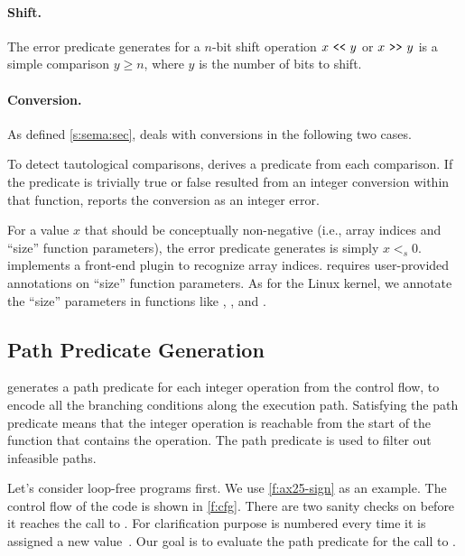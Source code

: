 \paragraph{Shift.}
The error predicate \sys generates for a $n$-bit shift operation
$x \ \texttt{<}\texttt{<}\  y$ or $x \ \texttt{>}\texttt{>}\  y$ is a simple comparison $y \geq n$, where
$y$ is the number of bits to shift.

\paragraph{Conversion.}
As defined \autoref{s:sema:sec}, \sys deals with conversions
in the following two cases.

To detect tautological comparisons, \sys derives a predicate from
each comparison.  If the predicate is trivially true or false
resulted from an integer conversion within that function, \sys
reports the conversion as an integer error.

For a value $x$ that should be conceptually non-negative (i.e.,
array indices and ``size'' function parameters), the error predicate
\sys generates is simply $x <_s 0$.
\sys implements a front-end plugin to recognize array indices.  \sys requires
user-provided annotations on ``size'' function parameters.  As for
the Linux kernel, we annotate the ``size'' parameters in functions like ,
, and .

\subsection{Path Predicate Generation}
\label{s:gen:path}

\sys generates a path predicate for each integer operation from the
control flow, to encode all the branching conditions along the
execution path.  Satisfying the path predicate means that the integer
operation is reachable from the start of the function that contains
the operation.  The path predicate is used to filter out infeasible
paths.

Let's consider loop-free programs first.
%
We use \autoref{f:ax25-sign} as an example.  The control flow of
the code is shown in \autoref{f:cfg}.  There are two sanity checks
on  before it reaches the call to .
For clarification purpose  is numbered every time it is
assigned a new value~\cite[\chapterautorefname~8.11]{whale}.  Our
goal is to evaluate the path predicate for the call to .

